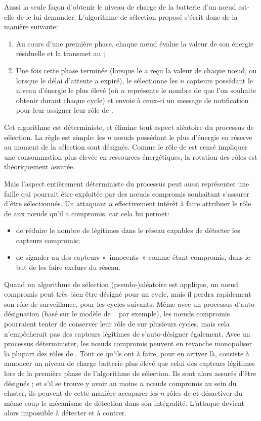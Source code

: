 Aussi la seule façon d'obtenir le niveau de charge de la batterie d'un nœud est-elle de le lui demander.
L'algorithme de sélection proposé s'écrit donc de la manière suivante:
\begin{enumerate}
    \item Au cours d'une première phase, chaque nœud évalue la valeur de son énergie résiduelle et la transmet au \ch;
    \item Une fois cette phase terminée (lorsque le \ch a reçu la valeur de chaque nœud, ou lorsque le délai d'attente a expiré), le \CH sélectionne les $n$ capteurs possédant le niveau d'énergie le plus élevé (où $n$ représente le nombre de \cns que l'on souhaite obtenir durant chaque cycle) et envoie à ceux-ci un message de notification pour leur assigner leur rôle de \cn.
\end{enumerate}
Cet algorithme est déterministe, et élimine tout aspect aléatoire du processus de sélection.
La règle est simple: les $n$ nœuds possédant le plus d'énergie en réserve au moment de la sélection sont désignés.
Comme le rôle de \cn est censé impliquer une consommation plus élevée en ressources énergétiques, la rotation des rôles est théoriquement assurée.

Mais l'aspect entièrement déterministe du processus peut aussi représenter une faille qui pourrait être exploitée par des nœuds compromis souhaitant s'assurer d'être sélectionnés.
Un attaquant a effectivement intérêt à faire attribuer le rôle de \cn aux nœuds qu'il a compromis, car cela lui permet:
\begin{itemize}
    \item de réduire le nombre de \cns légitimes dans le réseau capables de détecter les capteurs compromis;
    \item de signaler au \ch des capteurs « innocents » comme étant compromis, dans le but de les faire exclure du réseau.
\end{itemize}
Quand un algorithme de sélection (pseudo-)aléatoire est applique, un nœud compromis peut très bien être désigné pour un cycle, mais il perdra rapidement son rôle de surveillance, pour les cycles suivants.
Même avec un processus d'auto-désignation (basé sur le modèle de \leach~\cite{HHT02} par exemple), les nœuds compromis pourraient tenter de conserver leur rôle de \cn sur plusieurs cycles, mais cela n'empêcherait pas des capteurs légitimes de s'auto-désigner également.
Avec un processus déterminister, les nœuds compromis peuvent en revanche monopoliser la plupart des rôles de \cns.
Tout ce qu'ils ont à faire, pour en arriver là, consiste à annoncer un niveau de charge batterie plus élevé que celui des capteurs légitimes lors de la première phase de l'algorithme de sélection.
Ils sont alors assurés d'être désignés \cns; et s'il se trouve y avoir au moins $n$ nœuds compromis au sein du cluster, ils peuvent de cette manière accaparer les $n$ rôles de \cn et désactiver du même coup le mécanisme de détection dans son intégralité.
L'attaque devient alors impossible à détecter et à contrer.

